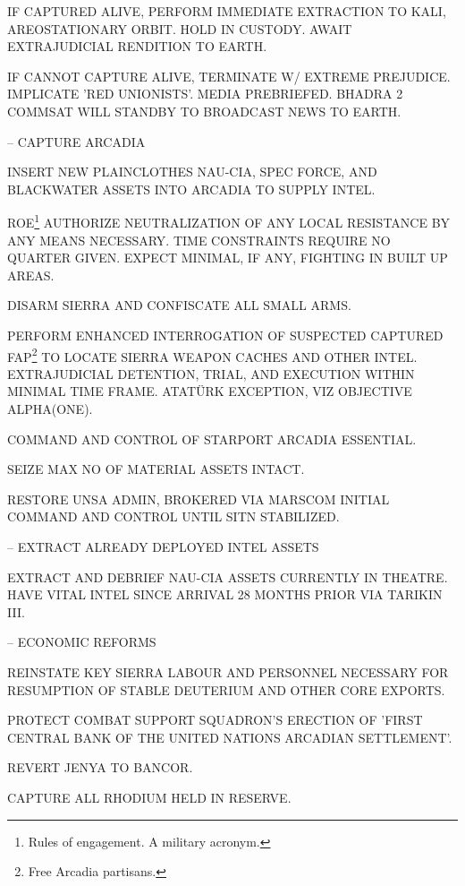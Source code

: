     \startitemize[n]
    \item IF CAPTURED ALIVE, PERFORM IMMEDIATE EXTRACTION TO KALI, AREOSTATIONARY ORBIT. HOLD IN CUSTODY. AWAIT EXTRAJUDICIAL RENDITION TO EARTH.
    \item IF CANNOT CAPTURE ALIVE, TERMINATE W/ EXTREME PREJUDICE. IMPLICATE 'RED UNIONISTS'. MEDIA PREBRIEFED. BHADRA 2 COMMSAT WILL STANDBY TO BROADCAST NEWS TO EARTH.
    \stopitemize

\item {} -- CAPTURE ARCADIA
    \startitemize[n]
    \item INSERT NEW PLAINCLOTHES NAU-CIA, SPEC FORCE, AND BLACKWATER ASSETS INTO ARCADIA TO SUPPLY INTEL.
    \item ROE\footnote{Rules of engagement. A military acronym.} AUTHORIZE NEUTRALIZATION OF ANY LOCAL RESISTANCE BY ANY MEANS NECESSARY. TIME CONSTRAINTS REQUIRE NO QUARTER GIVEN. EXPECT MINIMAL, IF ANY, FIGHTING IN BUILT UP AREAS.
    \item DISARM SIERRA AND CONFISCATE ALL SMALL ARMS.
    \item PERFORM ENHANCED INTERROGATION OF SUSPECTED CAPTURED FAP\footnote{Free Arcadia partisans.} TO LOCATE SIERRA WEAPON CACHES AND OTHER INTEL. EXTRAJUDICIAL DETENTION, TRIAL, AND EXECUTION WITHIN MINIMAL TIME FRAME. ATATÜRK EXCEPTION, VIZ OBJECTIVE ALPHA(ONE).
    \item COMMAND AND CONTROL OF STARPORT ARCADIA ESSENTIAL.
    \item SEIZE MAX NO OF MATERIAL ASSETS INTACT.
    \item RESTORE UNSA ADMIN, BROKERED VIA MARSCOM INITIAL COMMAND AND CONTROL UNTIL SITN STABILIZED.
    \stopitemize

\item {} -- EXTRACT ALREADY DEPLOYED INTEL ASSETS
    \startitemize[n]
    \item EXTRACT AND DEBRIEF NAU-CIA ASSETS CURRENTLY IN THEATRE. HAVE VITAL INTEL SINCE ARRIVAL 28 MONTHS PRIOR VIA TARIKIN III.
    \stopitemize

\item {} -- ECONOMIC REFORMS
    \startitemize[n]
    \item REINSTATE KEY SIERRA LABOUR AND PERSONNEL NECESSARY FOR RESUMPTION OF STABLE DEUTERIUM AND OTHER CORE EXPORTS.
    \item PROTECT COMBAT SUPPORT SQUADRON'S ERECTION OF 'FIRST CENTRAL BANK OF THE UNITED NATIONS ARCADIAN SETTLEMENT'.
    \item REVERT JENYA TO BANCOR.
    \item CAPTURE ALL RHODIUM HELD IN RESERVE.
    \stopitemize


